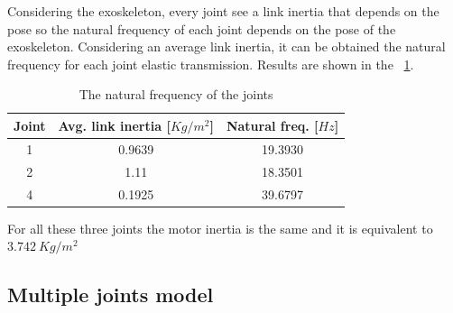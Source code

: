 \documentclass[journal]{IEEEtran}
\begin{document}
Considering the exoskeleton, every joint see a link inertia that depends on the pose so the natural frequency of each joint depends on the pose of the exoskeleton. 
Considering an average link inertia, it can be obtained the natural frequency for each joint elastic transmission. Results are shown in the \tablename \ \ref{tab:naturalFrequencies}.
\begin{table}[!t]
	\renewcommand{\arraystretch}{1.3}
	\caption{The natural frequency of the joints}
	\label{tab:naturalFrequencies}
	\centering
	\begin{tabular}{c c c}
		\hline \hline
		\bfseries Joint & \bfseries Avg. link inertia [$Kg/m^2$] & \bfseries Natural freq. [$Hz$]\\
		\hline
		1 & 0.9639 & 19.3930\\
		2 & 1.11 & 18.3501\\
		4 & 0.1925 & 39.6797\\
		\hline \hline
	\end{tabular}
\end{table}
For all these three joints the motor inertia is the same and it is equivalent to $3.742 \ Kg/m^2$


\subsection{Multiple joints model} \label{Full dynamics model}
\end{document}
